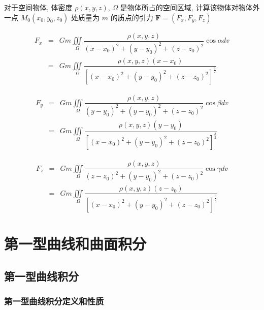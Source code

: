 \begin{theorem}[万有引力 $F = G\frac{m_{1}m_{2}}{r^{2}}$]

	对于空间物体, 体密度 $\rho(x,y,z)$, $\Omega$ 是物体所占的空间区域, 计算该物体对物体外一点 $M_{0}(x_{0},y_{0},z_{0})$ 处质量为 $m$ 的质点的引力 $\boldsymbol{F} = (F_{x},F_{y},F_{z})$
	
	\begin{eqnarray*}
		F_{x} & = & Gm \iiint\limits_{\Omega}\dfrac{\rho(x,y,z)}{(x-x_{0})^{2}+(y-y_{0})^{2}+(z-z_{0})^{2}}\cos\alpha dv \\
		      & = & Gm \iiint\limits_{\Omega}\dfrac{\rho(x,y,z)(x-x_{0})}{\left[(x-x_{0})^{2}+(y-y_{0})^{2}+(z-z_{0})^{2}\right]^{\frac{3}{2}}}
	\end{eqnarray*}

	\begin{eqnarray*}
		F_{y} & = & Gm \iiint\limits_{\Omega}\dfrac{\rho(x,y,z)}{(y-y_{0})^{2}+(y-y_{0})^{2}+(z-z_{0})^{2}}\cos\beta dv \\
		      & = & Gm \iiint\limits_{\Omega}\dfrac{\rho(x,y,z)(y-y_{0})}{\left[(x-x_{0})^{2}+(y-y_{0})^{2}+(z-z_{0})^{2}\right]^{\frac{3}{2}}}
	\end{eqnarray*}

	\begin{eqnarray*}
		F_{z} & = & Gm \iiint\limits_{\Omega}\dfrac{\rho(x,y,z)}{(z-z_{0})^{2}+(y-y_{0})^{2}+(z-z_{0})^{2}}\cos\gamma dv \\
		      & = & Gm \iiint\limits_{\Omega}\dfrac{\rho(x,y,z)(z-z_{0})}{\left[(x-x_{0})^{2}+(y-y_{0})^{2}+(z-z_{0})^{2}\right]^{\frac{3}{2}}}
	\end{eqnarray*}
\end{theorem}


\chapter{第一型曲线和曲面积分}

\section{第一型曲线积分}

\subsection{第一型曲线积分定义和性质}

